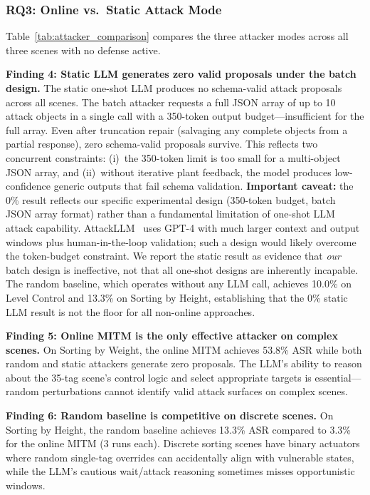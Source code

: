 \subsubsection{RQ3: Online vs.\ Static Attack Mode}
\label{sec:eval:rq3}

Table~\ref{tab:attacker_comparison} compares the three attacker modes across all three scenes with no defense active.



\textbf{Finding 4: Static LLM generates zero valid proposals under the batch design.} The static one-shot LLM produces no schema-valid attack proposals across all scenes. The batch attacker requests a full JSON array of up to 10 attack objects in a single call with a 350-token output budget---insufficient for the full array. Even after truncation repair (salvaging any complete objects from a partial response), zero schema-valid proposals survive. This reflects two concurrent constraints: (i)~the 350-token limit is too small for a multi-object JSON array, and (ii)~without iterative plant feedback, the model produces low-confidence generic outputs that fail schema validation. \textbf{Important caveat:} the 0\% result reflects our specific experimental design (350-token budget, batch JSON array format) rather than a fundamental limitation of one-shot LLM attack capability. AttackLLM~\cite{ahmed2025attackllm} uses GPT-4 with much larger context and output windows plus human-in-the-loop validation; such a design would likely overcome the token-budget constraint. We report the static result as evidence that \emph{our} batch design is ineffective, not that all one-shot designs are inherently incapable. The random baseline, which operates without any LLM call, achieves 10.0\% on Level Control and 13.3\% on Sorting by Height, establishing that the 0\% static LLM result is not the floor for all non-online approaches.

\textbf{Finding 5: Online MITM is the only effective attacker on complex scenes.} On Sorting by Weight, the online MITM achieves 53.8\% ASR while both random and static attackers generate zero proposals. The LLM's ability to reason about the 35-tag scene's control logic and select appropriate targets is essential---random perturbations cannot identify valid attack surfaces on complex scenes.

\textbf{Finding 6: Random baseline is competitive on discrete scenes.} On Sorting by Height, the random baseline achieves 13.3\% ASR compared to 3.3\% for the online MITM (3 runs each). Discrete sorting scenes have binary actuators where random single-tag overrides can accidentally align with vulnerable states, while the LLM's cautious wait/attack reasoning sometimes misses opportunistic windows.

